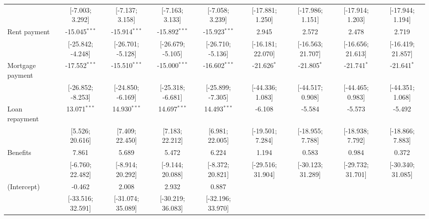 \begin{table}[htbp]
\begin{threeparttable}[b]
\begin{tabular}{lcccccccc}
                                     & [-7.003; 3.292]    & [-7.137; 3.158]    & [-7.163; 3.133]    & [-7.058; 3.239]    & [-17.881; 1.250]   & [-17.986; 1.151]   & [-17.914; 1.203]   & [-17.944; 1.194]\\   
         Rent payment                & -15.045$^{***}$    & -15.914$^{***}$    & -15.892$^{***}$    & -15.923$^{***}$    & 2.945              & 2.572              & 2.478              & 2.719\\   
                                     & [-25.842; -4.248]  & [-26.701; -5.128]  & [-26.679; -5.105]  & [-26.710; -5.136]  & [-16.181; 22.070]  & [-16.563; 21.707]  & [-16.656; 21.613]  & [-16.419; 21.857]\\   
         Mortgage payment            & -17.552$^{***}$    & -15.510$^{***}$    & -15.000$^{***}$    & -16.602$^{***}$    & -21.626$^{*}$      & -21.805$^{*}$      & -21.741$^{*}$      & -21.641$^{*}$\\   
                                     & [-26.852; -8.253]  & [-24.850; -6.169]  & [-25.318; -6.681]  & [-25.899; -7.305]  & [-44.336; 1.083]   & [-44.517; 0.908]   & [-44.465; 0.983]   & [-44.351; 1.068]\\   
         Loan repayment              & 13.071$^{***}$     & 14.930$^{***}$     & 14.697$^{***}$     & 14.493$^{***}$     & -6.108             & -5.584             & -5.573             & -5.492\\   
                                     & [5.526; 20.616]    & [7.409; 22.450]    & [7.183; 22.212]    & [6.981; 22.005]    & [-19.501; 7.284]   & [-18.955; 7.788]   & [-18.938; 7.792]   & [-18.866; 7.883]\\   
         Benefits                    & 7.861              & 5.689              & 5.472              & 6.224              & 1.194              & 0.583              & 0.984              & 0.372\\   
                                     & [-6.760; 22.482]   & [-8.914; 20.292]   & [-9.144; 20.088]   & [-8.372; 20.821]   & [-29.516; 31.904]  & [-30.123; 31.289]  & [-29.732; 31.701]  & [-30.340; 31.085]\\   
         (Intercept)                 & -0.462             & 2.008              & 2.932              & 0.887              &                    &                    &                    &   \\   
                                     & [-33.516; 32.591]  & [-31.074; 35.089]  & [-30.219; 36.083]  & [-32.196; 33.970]  &                    &                    &                    &   \\   

\end{tabular}
\end{threeparttable}
\end{table}
